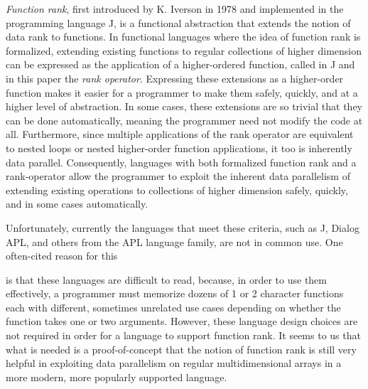 \textit{Function rank}, first introduced by K. Iverson in 1978\cite{opandfunc} and implemented in the programming language J, is a functional abstraction that extends the notion of data rank to functions. %
In functional languages where the idea of function rank is formalized, extending existing functions to regular collections of higher dimension can be expressed as the application of a higher-ordered function, 
called in J and in this paper the \textit{rank operator}. %
Expressing these extensions as a higher-order function makes it easier for a programmer to make them safely, quickly, and at a higher level of abstraction.
In some cases, these extensions are so trivial that they can be done automatically, meaning the programmer need not modify the code at all. %
Furthermore, since multiple applications of the rank operator are equivalent to nested loops or nested higher-order function applications, it too is inherently data parallel.
Consequently, languages with both formalized function rank and a rank-operator allow the programmer to 
exploit the inherent data parallelism of extending existing operations to collections of higher dimension safely, quickly, and in some cases automatically.

Unfortunately, currently the languages that meet these criteria, such as J, Dialog APL, and others from the APL language family, are not in common use.
One often-cited reason for this \begin{comment}TODO cite\end{comment} is that these languages are difficult to read, 
because, in order to use them effectively, a programmer must memorize dozens of 1 or 2 character functions each with different, sometimes unrelated use cases depending on whether the function takes one or two arguments. %
However, these language design choices are not required in order for a language to support function rank.
It seems to us that what is needed is a proof-of-concept that the notion of function rank is still very helpful in exploiting data parallelism on regular multidimensional arrays in a more modern, more popularly supported language.

